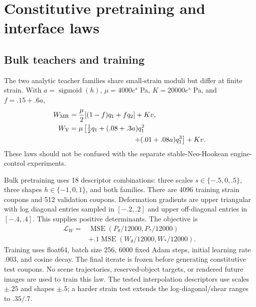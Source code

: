 \documentclass[10pt,twocolumn,letterpaper]{article}
\begin{document}
\section{Constitutive pretraining and interface laws}
\subsection{Bulk teachers and training}
The two analytic teacher families share small-strain moduli but differ at finite strain. With $a=\operatorname{sigmoid}(h)$, $\mu=4000e^s$ Pa, $K=20000e^s$ Pa, and $f=.15+.6a$,
\begin{align}
 W_{\rm MR}&=\frac{\mu}{2}[(1-f)q_1+fq_2]+Kv,\\
 W_{\rm Y}&=\mu\left[\tfrac12q_1+(.08+.3a)q_1^2\right.\nonumber\\
 &\hspace{32mm}\left.+(.01+.08a)q_1^3\right]+Kv.
\end{align}
These laws should not be confused with the separate stable-Neo-Hookean engine-control experiments.

Bulk pretraining uses 18 descriptor combinations: three scales $s\in\{-.5,0,.5\}$, three shapes $h\in\{-1,0,1\}$, and both families. There are 4096 training strain coupons and 512 validation coupons. Deformation gradients are upper triangular with log diagonal entries sampled in $[-.2,.2]$ and upper off-diagonal entries in $[-.4,.4]$. This supplies positive determinants. The objective is
\begin{equation}
\begin{aligned}
 \mathcal L_W={}&\operatorname{MSE}(P_\theta/12000,P_*/12000)\\
 &+.1\operatorname{MSE}(W_\theta/12000,W_*/12000).
\end{aligned}
\end{equation}
Training uses float64, batch size 256, 6000 fixed Adam steps, initial learning rate $.003$, and cosine decay. The final iterate is frozen before generating constitutive test coupons. No scene trajectories, reserved-object targets, or rendered future images are used to train this law. The tested interpolation descriptors use scales $\pm.25$ and shapes $\pm.5$; a harder strain test extends the log-diagonal/shear ranges to $.35/.7$.
\end{document}
